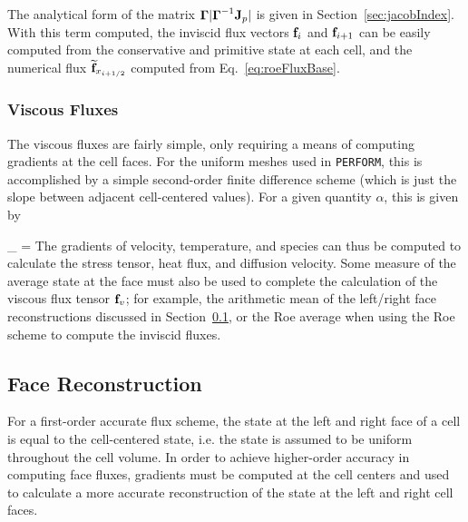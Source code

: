 The analytical form of the matrix $\boldsymbol{\Gamma} \vert \boldsymbol{\Gamma}^{-1} \mathbf{J}_p \vert$ is given in Section~\ref{sec:jacobIndex}. With this term computed, the inviscid flux vectors $\mathbf{f}_{i}$ and $\mathbf{f}_{i+1}$ can be easily computed from the conservative and primitive state at each cell, and the numerical flux $\widetilde{\mathbf{f}}_{x_{i+1/2}}$ computed from Eq.~\ref{eq:roeFluxBase}. 

\subsubsection{Viscous Fluxes}\label{sec:viscFluxes}

The viscous fluxes are fairly simple, only requiring a means of computing gradients at the cell faces. For the uniform meshes used in \verb|PERFORM|, this is accomplished by a simple second-order finite difference scheme (which is just the slope between adjacent cell-centered values). For a given quantity $\alpha$, this is given by

\be
    \nabla \alpha_{\faceXRight} =  
\ee
The gradients of velocity, temperature, and species can thus be computed to calculate the stress tensor, heat flux, and diffusion velocity. Some measure of the average state at the face must also be used to complete the calculation of the viscous flux tensor $\mathbf{f}_v$; for example, the arithmetic mean of the left/right face reconstructions discussed in Section~\ref{sec:faceRecon}, or the Roe average when using the Roe scheme to compute the inviscid fluxes.

\newpage
\subsection{Face Reconstruction}\label{sec:faceRecon}

For a first-order accurate flux scheme, the state at the left and right face of a cell is equal to the cell-centered state, i.e. the state is assumed to be uniform throughout the cell volume. In order to achieve higher-order accuracy in computing face fluxes, gradients must be computed at the cell centers and used to calculate a more accurate reconstruction of the state at the left and right cell faces.

